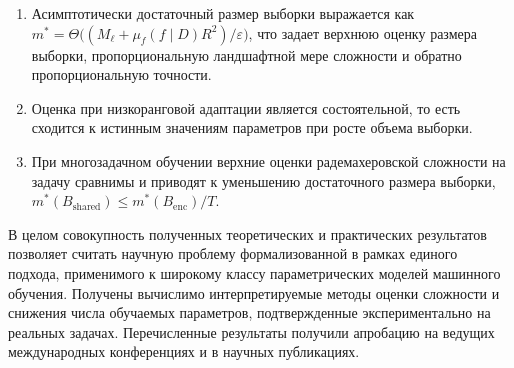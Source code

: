 \begin{enumerate}
    \item Асимптотически достаточный размер выборки выражается как $m^*=\Theta\bigl((M_\ell+\mu_f(f\mid D)R^2)/\varepsilon\bigr)$, что задает верхнюю оценку размера выборки, пропорциональную ландшафтной мере сложности и обратно пропорциональную точности.
    \item Оценка при низкоранговой адаптации является состоятельной, то есть сходится к истинным значениям параметров при росте объема выборки.
    \item При многозадачном обучении верхние оценки радемахеровской сложности на задачу сравнимы и приводят к уменьшению достаточного размера выборки, $m^*(B_{\mathrm{shared}})\le m^*(B_{\mathrm{enc}})/T$.
\end{enumerate}

В целом совокупность полученных теоретических и практических результатов позволяет считать научную проблему формализованной в рамках единого подхода, применимого к широкому классу параметрических моделей машинного обучения.
Получены вычислимо интерпретируемые методы оценки сложности и снижения числа обучаемых параметров, подтвержденные экспериментально на реальных задачах.
Перечисленные результаты получили апробацию на ведущих международных конференциях и в научных публикациях.